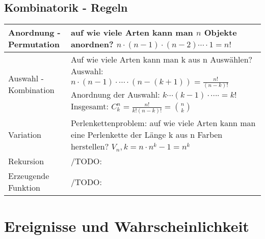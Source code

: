 \documentclass[margin=normal]{tex/hsrzf}
\begin{document}
\subsection{Kombinatorik - Regeln}  
\begin{tabular}{|l| p{10cm}|}
    \hline Anordnung - Permutation & 
    auf wie viele Arten kann man $n$ Objekte anordnen? \newline
    $ n \cdot (n-1) \cdot (n-2) \cdots \cdot 1 = n! $ \\
    \hline Auswahl - Kombination & 
    Auf wie viele Arten kann man k aus n Auswählen? \newline
    Auswahl: $ n \cdot (n-1) \cdot \cdots \cdot (n-(k+1)) = \frac{n!}{(n-k)!}$
    Anordnung der Auswahl:  $k \cdots (k-1) \cdot \cdots \cdot = k!$
    Insgesamt: $ C^n_k = \frac{n!}{k!(n-k)!} = \binom{n}{k} $ \\
    \hline Variation & 
    Perlenkettenproblem:
    auf wie viele Arten kann man eine Perlenkette der Länge k aus n Farben herstellen? \newline
    $V_n,k = n \cdot n^k-1 = n^k$\\
    \hline Rekursion & /TODO:
    \\ 
    \hline Erzeugende Funktion & /TODO:
    \\ 
    \hline
\end{tabular}

\section{Ereignisse und Wahrscheinlichkeit}
\end{document}
